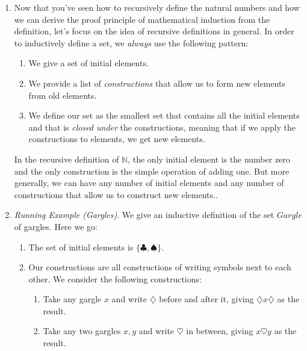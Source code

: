 \begin{enumerate}[{\thesection}.1]
\item Now that you've seen how to recursively define the natural numbers and how we can derive the proof principle of mathematical induction from the definition, let's focus on the idea of recursive definitions in general. In order to inductively define a set, we \emph{always} use the following pattern:
	\begin{enumerate}[1.]
	
		\item We give a set of initial elements.
		
		\item We provide a list of \emph{constructions} that allow us to form new elements from old elements.
		
		\item We define our set as the smallest set that contains all the initial elements and that is \emph{closed under} the constructions, meaning that if we apply the constructions to elements, we get new elements.
	
	\end{enumerate} 
	
In the recursive definition of $\mathbb{N}$, the only initial element is the number zero and the only construction is the simple operation of adding one. But more generally, we can have any number of initial elements and any number of constructions that allow us to construct new elements..

	\item \emph{Running Example (Gargles)}. We give an inductive definition of the set $Gargle$ of gargles. Here we go: 
	
		\begin{enumerate}[1.]
		
			\item The set of initial elements is $\{\clubsuit,\spadesuit\}$.
			
			\item Our constructions are all constructions of writing symbols next to each other. We consider the following constructions:
			\begin{enumerate}
						
				\item Take any gargle $x$ and write $\diamondsuit$ before and after it, giving $\diamondsuit x\diamondsuit$ as the result.
			
				\item Take any two gargles $x,y$ and write $\heartsuit$ in between, giving $x\heartsuit y$ as the result.
							

\end{enumerate}
\end{enumerate}
\end{enumerate}
